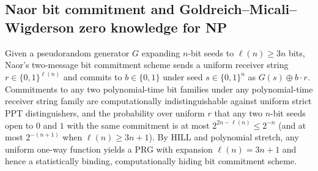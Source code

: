 \begin{result}
\subsection{Naor bit commitment and Goldreich--Micali--Wigderson zero knowledge for NP}
Given a pseudorandom generator $G$ expanding $n$-bit seeds to $\ell(n)\ge 3n$ bits,
Naor's two-message bit commitment scheme sends a uniform receiver string $r\in\{0,1\}^{\ell(n)}$
and commits to $b\in\{0,1\}$ under seed $s\in\{0,1\}^n$ as $G(s)\oplus b\cdot r$.
Commitments to any two polynomial-time bit families under any polynomial-time receiver
string family are computationally indistinguishable against uniform strict PPT
distinguishers, and the probability over uniform $r$ that any two $n$-bit seeds open
to $0$ and $1$ with the same commitment is at most $2^{2n-\ell(n)}\le 2^{-n}$ (and at
most $2^{-(n+1)}$ when $\ell(n)\ge 3n+1$). By HILL and polynomial stretch, any uniform
one-way function yields a PRG with expansion $\ell(n)=3n+1$ and hence a statistically
binding, computationally hiding bit commitment scheme.


\end{result}
